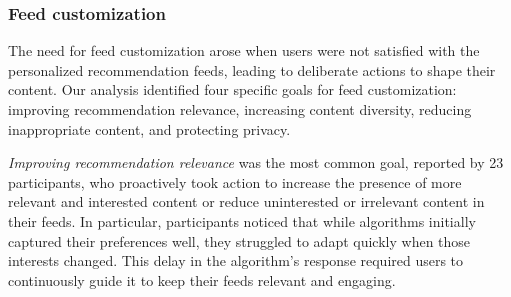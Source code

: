 
\subsubsection{Feed customization} 
The need for feed customization arose when users were not satisfied with the personalized recommendation feeds, leading to deliberate actions to shape their content. Our analysis identified four specific goals for feed customization: improving recommendation relevance, increasing content diversity, reducing inappropriate content, and protecting privacy. 

\textit{Improving recommendation relevance} was the most common goal, reported by 23 participants, who proactively took action to increase the presence of more relevant and interested content or reduce uninterested or irrelevant content in their feeds. In particular, participants noticed that while algorithms initially captured their preferences well, they struggled to adapt quickly when those interests changed. This delay in the algorithm's response required users to continuously guide it to keep their feeds relevant and engaging. 



